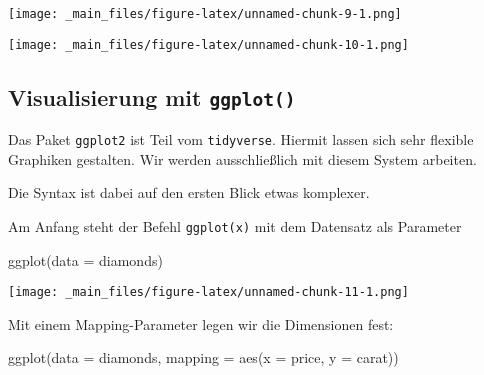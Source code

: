 \documentclass[11pt,german,a4paper]{article}
\newenvironment{Shaded}{\begin{snugshade}}{\end{snugshade}}
\newcommand{\AttributeTok}[1]{\textcolor[rgb]{0.77,0.63,0.00}{#1}}
\newcommand{\FunctionTok}[1]{\textcolor[rgb]{0.00,0.00,0.00}{#1}}
\newcommand{\NormalTok}[1]{#1}
\newcommand{\SpecialCharTok}[1]{\textcolor[rgb]{0.00,0.00,0.00}{#1}}
\begin{document}
\begin{Shaded}
\end{Shaded}

\texttt{[image: \_main\_files/figure-latex/unnamed-chunk-9-1.png]}

\begin{Shaded}
\end{Shaded}

\texttt{[image: \_main\_files/figure-latex/unnamed-chunk-10-1.png]}

\hypertarget{visualisierung-mit-ggplot}{%
\subsection{\texorpdfstring{Visualisierung mit \texttt{ggplot()}}{Visualisierung mit ggplot()}}\label{visualisierung-mit-ggplot}}

Das Paket \texttt{ggplot2} ist Teil vom \texttt{tidyverse}. Hiermit lassen sich sehr flexible Graphiken gestalten. Wir werden ausschließlich mit diesem System arbeiten.

Die Syntax ist dabei auf den ersten Blick etwas komplexer.

Am Anfang steht der Befehl \texttt{ggplot(x)} mit dem Datensatz als Parameter

\begin{Shaded}
\begin{Highlighting}[]
\FunctionTok{ggplot}\NormalTok{(}\AttributeTok{data =}\NormalTok{ diamonds)}
\end{Highlighting}
\end{Shaded}

\texttt{[image: \_main\_files/figure-latex/unnamed-chunk-11-1.png]}

Mit einem Mapping-Parameter legen wir die Dimensionen fest:

\begin{Shaded}
\begin{Highlighting}[]
\FunctionTok{ggplot}\NormalTok{(}\AttributeTok{data =}\NormalTok{ diamonds, }\AttributeTok{mapping =} \FunctionTok{aes}\NormalTok{(}\AttributeTok{x =}\NormalTok{ price, }\AttributeTok{y =}\NormalTok{ carat))}
\end{Highlighting}
\end{Shaded}
\end{document}
